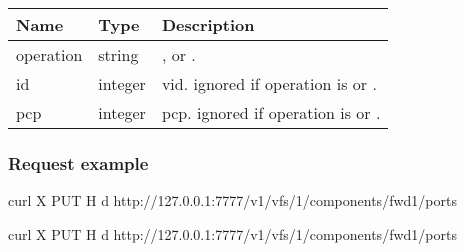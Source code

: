 \documentclass[a4paper,11pt,openany,oneside,english]{sphinxmanual}
\begin{document}
\begin{savenotes}\sphinxattablestart
\centering
{}
\sphinxthecaptionisattop
{}\label{\detokenize{api_ref/spp_vf:id30}}\label{\detokenize{api_ref/spp_vf:table-spp-ctl-spp-vf-comp-port-body-vlan}}
\sphinxaftertopcaption
\begin{tabulary}{\linewidth}[t]{|T|T|T|}
\hline
\sphinxstyletheadfamily 
Name
&\sphinxstyletheadfamily 
Type
&\sphinxstyletheadfamily 
Description
\\
\hline
operation
&
string
&
,  or .
\\
\hline
id
&
integer
&
vid. ignored if operation is  or .
\\
\hline
pcp
&
integer
&
pcp. ignored if operation is  or .
\\
\hline
\end{tabulary}
\par
\sphinxattableend\end{savenotes}


\subsubsection{Request example}
\label{\detokenize{api_ref/spp_vf:id11}}
\begin{sphinxVerbatim}[commandchars=\\\{\},formatcom=\footnotesize]
 curl \PYGZhy{}X PUT \PYGZhy{}H  
  \PYGZhy{}d 
 
  http://127.0.0.1:7777/v1/vfs/1/components/fwd1/ports
\end{sphinxVerbatim}

\begin{sphinxVerbatim}[commandchars=\\\{\},formatcom=\footnotesize]
 curl \PYGZhy{}X PUT \PYGZhy{}H  
  \PYGZhy{}d  
  http://127.0.0.1:7777/v1/vfs/1/components/fwd1/ports
\end{sphinxVerbatim}
\end{document}
